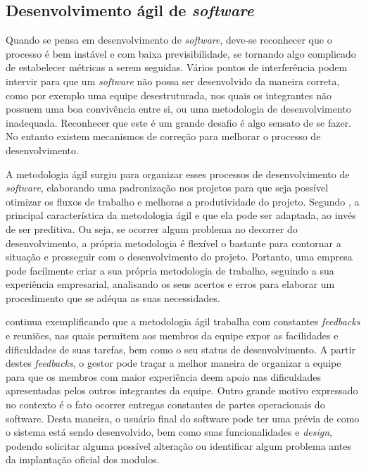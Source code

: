 \subsection{{Desenvolvimento ágil de \textit{software}}}

Quando se pensa em desenvolvimento de \textit{software}, deve-se reconhecer que o processo é bem instável e com baixa previsibilidade, se tornando algo complicado de estabelecer métricas a serem seguidas. Vários pontos de interferência podem intervir para que um \textit{software} não possa ser desenvolvido da maneira correta, como por exemplo uma equipe desestruturada, nos quais os integrantes não possuem uma boa convivência entre si, ou uma metodologia de desenvolvimento inadequada. Reconhecer que este é um grande desafio é algo sensato de se fazer. No entanto existem mecanismos de correção para melhorar o processo de desenvolvimento.

A metodologia ágil surgiu para organizar esses processos de desenvolvimento de \textit{software}, elaborando uma padronização nos projetos para que seja possível otimizar os fluxos de trabalho e melhoras a produtividade do projeto. Segundo , a principal característica da metodologia ágil e que ela pode ser adaptada, ao invés de ser preditiva. Ou seja, se ocorrer algum problema no decorrer do desenvolvimento, a própria metodologia é flexível o bastante para contornar a situação e prosseguir com o desenvolvimento do projeto. Portanto, uma empresa pode facilmente criar a sua própria metodologia de trabalho, seguindo a sua experiência empresarial, analisando os seus acertos e erros para elaborar um procedimento que se adéqua as suas necessidades. 

 continua exemplificando que a metodologia ágil trabalha com constantes \textit{feedbacks} e reuniões, nas quais permitem aos membros da equipe expor as facilidades e dificuldades de suas tarefas, bem como o seu status de desenvolvimento. A partir destes \textit{feedbacks}, o gestor pode traçar a melhor maneira de organizar a equipe para que os membros com maior experiência deem apoio nas dificuldades apresentadas pelos outros integrantes da equipe. Outro grande motivo expressado no contexto é o fato ocorrer entregas constantes de partes operacionais do software. Desta maneira, o usuário final do software pode ter uma prévia de como o sistema está sendo desenvolvido, bem como suas funcionalidades e \textit{design}, podendo solicitar alguma possível alteração ou identificar algum problema antes da implantação oficial dos modulos.



